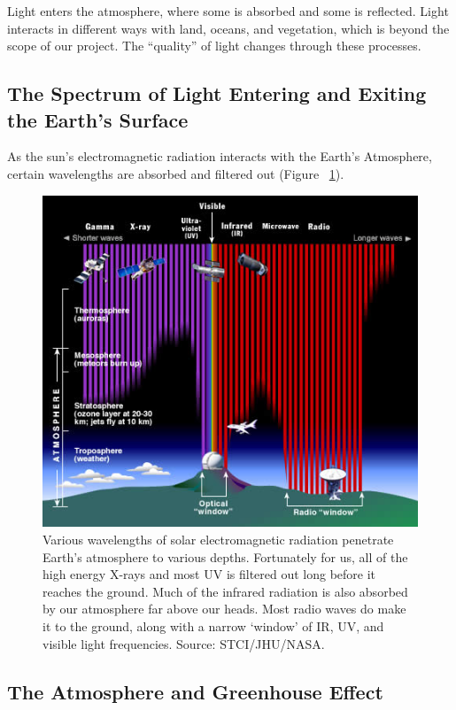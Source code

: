\documentclass{book}\usepackage{knitr}
\begin{document}
\begin{knitrout}
\begin{kframe}
Light enters the atmosphere, where some is absorbed and some is reflected. Light interacts in different ways with land, oceans, and vegetation, which is beyond the scope of our project. The ``quality'' of light changes through these processes. 

\subsection{The Spectrum of Light Entering and Exiting the Earth's Surface}

As the sun's electromagnetic radiation interacts with the Earth's Atmosphere, certain wavelengths are absorbed and filtered out (Figure~ \ref{fig:em-entering}).

\begin{figure}
\includegraphics[width=\linewidth]{images/earth-system/em-radiation-atmosph-depth-stsci.jpg}
\caption{Various wavelengths of solar electromagnetic radiation penetrate Earth's atmosphere to various depths. Fortunately for us, all of the high energy X-rays and most UV is filtered out long before it reaches the ground. Much of the infrared radiation is also absorbed by our atmosphere far above our heads. Most radio waves do make it to the ground, along with a narrow `window' of IR, UV, and visible light frequencies. Source: STCI/JHU/NASA.}
\label{fig:em-entering}
\end{figure}

\subsection{The Atmosphere and Greenhouse Effect}




\end{kframe}
\end{knitrout}
\end{document}
